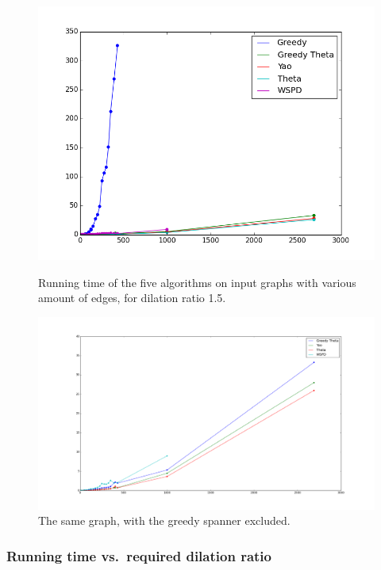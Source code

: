 \documentclass[a4paper,twoside,11pt,hidelinks]{article}
\theoremstyle{plain}
\theoremstyle{definition}  %
\begin{document}
\begin{figure}[h]
    \begin{minipage}[t]{0.42\textwidth}
        \centering
        \includegraphics[width=\textwidth]{figures/Running_time_vs_number_of_vertices}
        \caption{Running time of the five algorithms on input graphs with various amount of edges, for dilation ratio 1.5.}
        \label{fig:runningtime}
    \end{minipage}
    \hfill
    \begin{minipage}[t]{0.54\textwidth}
        \centering
        \includegraphics[width=\textwidth]{figures/Running_time_vs_number_of_vertices_wo_greedy}
        \caption{The same graph, with the greedy spanner excluded.}
        \label{fig:runningtime_wo_greedy}
    \end{minipage}
\end{figure}

\subsubsection{Running time vs.\ required dilation ratio}
\end{document}
